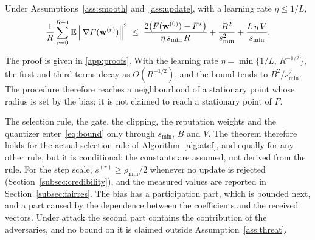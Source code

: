 \begin{revblock}
\begin{theorem}
	\label{thm:convergence}
	Under Assumptions~\ref{ass:smooth} and~\ref{ass:update}, with a learning rate $\eta\le 1/L$,
	\begin{equation}
		\frac{1}{R}\sum_{r=0}^{R-1}\mathbb{E}\left\lVert \nabla F(\mathbf{w}^{(r)}) \right\rVert^2\;\le\;\frac{2\bigl(F(\mathbf{w}^{(0)})-F^{\star}\bigr)}{\eta\,s_{\min}\,R}+\frac{B^2}{s_{\min}^2}+\frac{L\,\eta\,V}{s_{\min}} .
		\label{eq:bound}
	\end{equation}
\end{theorem}

The proof is given in \ref{app:proofs}. With the learning rate $\eta=\min\{1/L,\,R^{-1/2}\}$, the first and third terms decay as $O(R^{-1/2})$, and the bound tends to $B^2/s_{\min}^2$. The procedure therefore reaches a neighbourhood of a stationary point whose radius is set by the bias; it is not claimed to reach a stationary point of $F$.

\begin{remark}
	\label{rem:scope}
	The selection rule, the gate, the clipping, the reputation weights and the quantizer enter~\eqref{eq:bound} only through $s_{\min}$, $B$ and $V$. The theorem therefore holds for the actual selection rule of Algorithm~\ref{alg:atef}, and equally for any other rule, but it is conditional: the constants are assumed, not derived from the rule. For the step scale, $s^{(r)}\ge\rho_{\min}/2$ whenever no update is rejected (Section~\ref{subsec:credibility}), and the measured values are reported in Section~\ref{subsec:fairres}. The bias has a participation part, which is bounded next, and a part caused by the dependence between the coefficients and the received vectors. Under attack the second part contains the contribution of the adversaries, and no bound on it is claimed outside Assumption~\ref{ass:threat}.
\end{remark}


\end{revblock}

